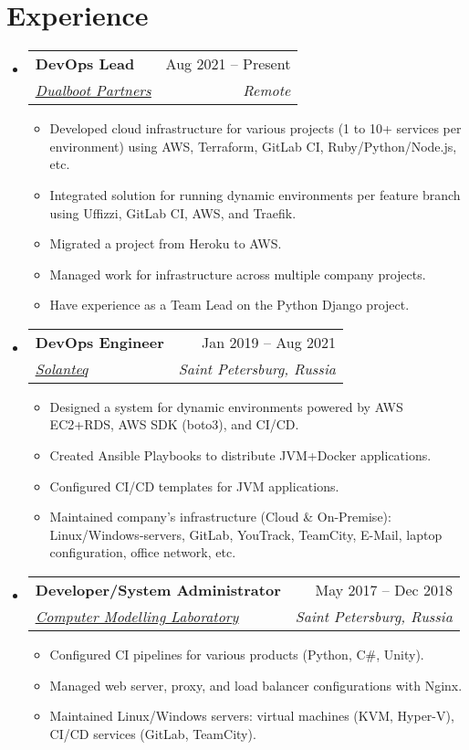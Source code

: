 \documentclass[a4paper,10pt]{article}
\makeatletter
\newcommand{\resumeItem}[1]{
  \item\small{#1}
}
\newcommand{\resumeItemListStart}{\begin{itemize}[rightmargin=0.11in]}
\newcommand{\resumeItemListEnd}{\end{itemize}}
\newcommand{\resumeQuadHeading}[4]{
  \item
  \begin{tabular*}{0.96\textwidth}[t]{l@{\extracolsep{\fill}}r}
    \textbf{#1} & #2 \\
    \textit{\small#3} & \textit{\small #4} \\
  \end{tabular*}
}
\newcommand{\resumeHeadingListStart}{
  \begin{itemize}[leftmargin=0.15in, label={}]
}
\newcommand{\resumeHeadingListEnd}{\end{itemize}}
\newcommand{\hrefUline}[2]{
  \href{#1}{\uline{#2}}
}
\makeatother
\begin{document}

\section{Experience}
\resumeHeadingListStart{}
  \resumeQuadHeading{DevOps Lead}{Aug 2021 -- Present}
  {\hrefUline{https://www.linkedin.com/company/dualbootpartners/}{Dualboot Partners}}{Remote}
  \resumeItemListStart{}
    \resumeItem{Developed cloud infrastructure for various projects (1 to 10+ services per environment) using AWS, Terraform, GitLab CI, Ruby/Python/Node.js, etc.}
    \resumeItem{Integrated solution for running dynamic environments per feature branch using Uffizzi, GitLab CI, AWS, and Traefik.}
    \resumeItem{Migrated a project from Heroku to AWS.}
    \resumeItem{Managed work for infrastructure across multiple company projects.}
    \resumeItem{Have experience as a Team Lead on the Python Django project.}
  \resumeItemListEnd{}

  \resumeQuadHeading{DevOps Engineer}{Jan 2019 -- Aug 2021}
  {\hrefUline{https://www.linkedin.com/company/solanteq/}{Solanteq}}{Saint Petersburg, Russia}
    \resumeItemListStart{}
      \resumeItem{Designed a system for dynamic environments powered by AWS EC2+RDS, AWS SDK (boto3), and CI/CD.}
      \resumeItem{Created Ansible Playbooks to distribute JVM+Docker applications.}
      \resumeItem{Configured CI/CD templates for JVM applications.}
      \resumeItem{Maintained company's infrastructure (Cloud \& On-Premise): Linux/Windows-servers, GitLab, YouTrack, TeamCity, E-Mail, laptop configuration, office network, etc.}
    \resumeItemListEnd{}

  \resumeQuadHeading{Developer/System Administrator}{May 2017 -- Dec 2018}
  {\hrefUline{https://sim-lab.ru}{Computer Modelling Laboratory}}{Saint Petersburg, Russia}
    \resumeItemListStart{}
      \resumeItem{Configured CI pipelines for various products (Python, C\#, Unity).}
      \resumeItem{Managed web server, proxy, and load balancer configurations with Nginx.}
      \resumeItem{Maintained Linux/Windows servers: virtual machines (KVM, Hyper-V), CI/CD services (GitLab, TeamCity).}
    \resumeItemListEnd{}
\resumeHeadingListEnd{}


\end{document}
